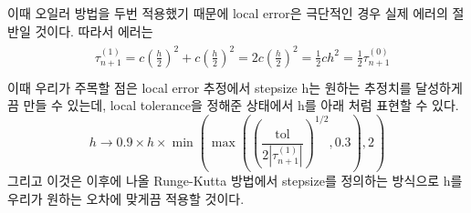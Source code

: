 \documentclass[11pt]{article}
\begin{document}
이때 오일러 방법을 두번 적용했기 때문에 local error은 극단적인 경우 실제 에러의 절반일 것이다. 따라서 에러는
\begin{equation}
\begin{split}
\begin{aligned}
& \tau_{{n+1}}^{{(1)}}=c\left({\frac{h}{2}}\right)^{2}+c\left({\frac{h}{2}}\right)^{2}=2c\left({\frac{h}{2}}\right)^{2}={\frac{1}{2}}ch^{2}={\frac{1}{2}}\tau_{{n+1}}^{{(0)}} \\
\end{aligned}
\end{split}
\end{equation}
이때 우리가 주목할 점은 local error 추정에서 stepsize h는 원하는 추정치를 달성하게끔 만들 수 있는데, local tolerance을 정해준 상태에서 h를 아래 처럼 표현할 수 있다.
\begin{equation}
h\rightarrow 0.9\times h\times \min \left(\max \left(\left({\frac{\text{tol}}{2\left|\tau_{n+1}^{(1)}\right|}}\right)^{1/2},0.3\right),2\right)
\end{equation}
그리고 이것은 이후에 나올 Runge-Kutta 방법에서 stepsize를 정의하는 방식으로 h를 우리가 원하는 오차에 맞게끔 적용할 것이다.
\end{document}
